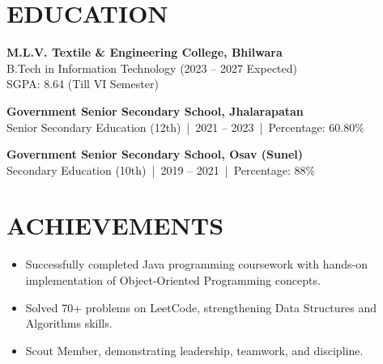 \documentclass[11pt,a4paper]{article}
\begin{document}
\section*{EDUCATION}
\textbf{M.L.V. Textile \& Engineering College, Bhilwara}\\
B.Tech in Information Technology (2023 -- 2027 Expected) \\
SGPA: 8.64 (Till VI Semester)

\vspace{0.1cm}

\textbf{Government Senior Secondary School, Jhalarapatan}\\
Senior Secondary Education (12th) \,|\, 2021 -- 2023 \,|\, Percentage: 60.80\%

\vspace{0.1cm}

\textbf{Government Senior Secondary School, Osav (Sunel)}\\
Secondary Education (10th) \,|\, 2019 -- 2021 \,|\, Percentage: 88\%

\vspace{0.4cm}

\section*{ACHIEVEMENTS}
\begin{itemize}[leftmargin=*]
    \item Successfully completed Java programming coursework with hands-on implementation of Object-Oriented Programming concepts.
    \item Solved 70+ problems on LeetCode, strengthening Data Structures and Algorithms skills.
    \item Scout Member, demonstrating leadership, teamwork, and discipline.
\end{itemize}
\end{document}
